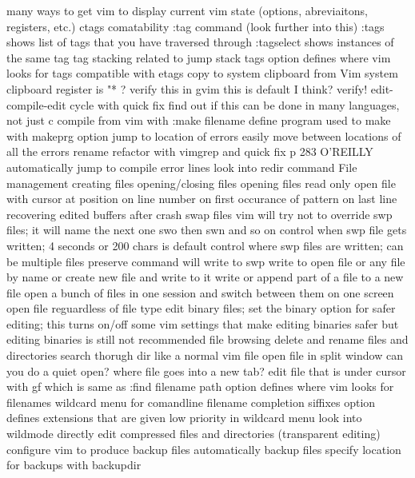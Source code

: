 \documentclass[12pt]{book}
\begin{document}
{  many ways to get vim to display current vim state (options, abreviaitons, registers, etc.)
  ctags comatability
    :tag command (look further into this)
    :tags shows list of tags that you have traversed through
    :tagselect shows instances of the same tag
    tag stacking
      related to jump stack
    tags option defines where vim looks for tags
    compatible with etags
  copy to system clipboard from Vim
    system clipboard register is "* ?  verify this
    in gvim this is default I think? verify!
  edit-compile-edit cycle with quick fix
    find out if this can be done in many languages, not just c
    compile from vim with :make filename
    define program used to make with makeprg option
    jump to location of errors
    easily move between locations of all the errors
  rename refactor with vimgrep and quick fix
    p 283 O'REILLY
  automatically jump to compile error lines
    look into redir command
  File management
    creating files
    opening/closing files
    opening files read only
    open file with cursor at position
      on line number
      on first occurance of pattern
      on last line
    recovering edited buffers after crash
      swap files
      vim will try not to override swp files; it will name the next one swo then swn and so on
      control when swp file gets written; 4 seconds or 200 chars is default
      control where swp files are written; can be multiple files
      preserve command will write to swp
    write to open file or any file by name or create new file and write to it
    write or append part of a file to a new file
    open a bunch of files in one session and switch between them on one screen
    open file reguardless of file type
      edit binary files; set the binary option for safer editing; this turns on/off some vim settings that make editing binaries safer but editing binaries is still not recommended
    file browsing
      delete and rename files and directories
      search thorugh dir like a normal vim file
      open file in split window
      can you do a quiet open? where file goes into a new tab?
      edit file that is under cursor with gf which is same as :find filename
        path option defines where vim looks for filenames
      wildcard menu for comandline filename completion
        siffixes option defines extensions that are given low priority in wildcard menu
        look into wildmode
    directly edit compressed files and directories (transparent editing)
    configure vim to produce backup files
      automatically backup files
      specify location for backups with backupdir
}
\end{document}
